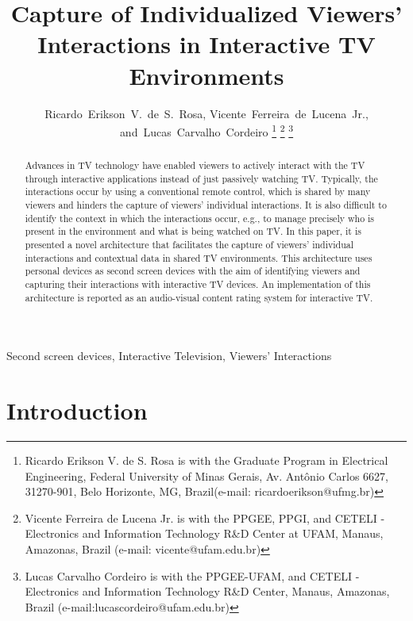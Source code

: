 \documentclass[journal]{IEEEtran}
\begin{document}
\title{Capture of Individualized Viewers' Interactions in Interactive TV Environments}
\author{Ricardo~Erikson~V.~de~S.~Rosa, 
	Vicente~Ferreira~de~Lucena~Jr.,
	and~Lucas~Carvalho~Cordeiro
\thanks{Ricardo Erikson V. de S. Rosa is with the Graduate Program in Electrical Engineering, Federal University of Minas Gerais, Av. Antônio Carlos 6627, 31270-901, Belo Horizonte, MG, Brazil(e-mail: ricardoerikson@ufmg.br)}%
\thanks{Vicente Ferreira de Lucena Jr. is with the PPGEE, PPGI, and CETELI - Electronics and Information Technology R\&D Center at UFAM, Manaus, Amazonas, Brazil (e-mail: vicente@ufam.edu.br)}%
\thanks{Lucas Carvalho Cordeiro is with the PPGEE-UFAM, and CETELI - Electronics and Information Technology R\&D Center, Manaus, Amazonas, Brazil (e-mail:lucascordeiro@ufam.edu.br)}}

\maketitle

\begin{abstract}
Advances in TV technology have enabled viewers to actively interact with the TV through interactive applications instead of just passively watching TV. Typically, the interactions occur by using a conventional remote control, which is shared by many viewers and hinders the capture of viewers' individual interactions. It is also difficult to identify the context in which the interactions occur, e.g., to manage precisely who is present in the environment and what is being watched on TV. In this paper, it is presented a novel architecture that facilitates the capture of viewers' individual interactions and contextual data in shared TV environments. This architecture uses personal devices as second screen devices with the aim of identifying viewers and capturing their interactions with interactive TV devices. An implementation of this architecture is reported as an audio-visual content rating system for interactive TV.
\end{abstract}

\begin{IEEEkeywords}
Second screen devices, Interactive Television, Viewers' Interactions
\end{IEEEkeywords}

\IEEEpeerreviewmaketitle

\section{Introduction}
\end{document}
